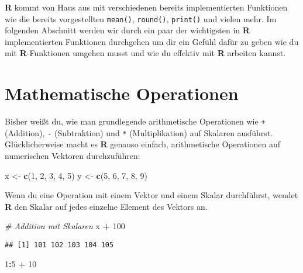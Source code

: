 \documentclass[
]{book}
\newenvironment{Shaded}{\begin{snugshade}}{\end{snugshade}}
\newcommand{\CommentTok}[1]{\textcolor[rgb]{0.56,0.35,0.01}{\textit{#1}}}
\newcommand{\DecValTok}[1]{\textcolor[rgb]{0.00,0.00,0.81}{#1}}
\newcommand{\KeywordTok}[1]{\textcolor[rgb]{0.13,0.29,0.53}{\textbf{#1}}}
\newcommand{\NormalTok}[1]{#1}
\newcommand{\OperatorTok}[1]{\textcolor[rgb]{0.81,0.36,0.00}{\textbf{#1}}}
\newcommand{\StringTok}[1]{\textcolor[rgb]{0.31,0.60,0.02}{#1}}
\begin{document}
\textbf{R} kommt von Haus aus mit verschiedenen bereits implementierten Funktionen wie die bereits vorgestellten \texttt{mean()}, \texttt{round()}, \texttt{print()} und vielen mehr.
Im folgenden Abschnitt werden wir durch ein paar der wichtigsten in \textbf{R} implementierten Funktionen durchgehen um dir ein Gefühl dafür zu geben wie du mit \textbf{R}-Funktionen umgehen musst und wie du effektiv mit \textbf{R} arbeiten kannst.

\hypertarget{mathematische-operationen}{%
\section{Mathematische Operationen}\label{mathematische-operationen}}

Bisher weißt du, wie man grundlegende arithmetische Operationen wie \texttt{+} (Addition), \texttt{-} (Subtraktion) und \texttt{*} (Multiplikation) auf Skalaren ausführst.
Glücklicherweise macht es \textbf{R} genauso einfach, arithmetische Operationen auf numerischen Vektoren durchzuführen:

\begin{Shaded}
\begin{Highlighting}[]
\NormalTok{x <-}\StringTok{ }\KeywordTok{c}\NormalTok{(}\DecValTok{1}\NormalTok{, }\DecValTok{2}\NormalTok{, }\DecValTok{3}\NormalTok{, }\DecValTok{4}\NormalTok{, }\DecValTok{5}\NormalTok{)}
\NormalTok{y <-}\StringTok{ }\KeywordTok{c}\NormalTok{(}\DecValTok{5}\NormalTok{, }\DecValTok{6}\NormalTok{, }\DecValTok{7}\NormalTok{, }\DecValTok{8}\NormalTok{, }\DecValTok{9}\NormalTok{)}
\end{Highlighting}
\end{Shaded}

Wenn du eine Operation mit einem Vektor und einem Skalar durchführst, wendet \textbf{R} den Skalar auf jedes einzelne Element des Vektors an.

\begin{Shaded}
\begin{Highlighting}[]
\CommentTok{# Addition mit Skalaren}
\NormalTok{x }\OperatorTok{+}\StringTok{ }\DecValTok{100}
\end{Highlighting}
\end{Shaded}

\begin{verbatim}
## [1] 101 102 103 104 105
\end{verbatim}

\begin{Shaded}
\begin{Highlighting}[]
\DecValTok{1}\OperatorTok{:}\DecValTok{5} \OperatorTok{+}\StringTok{ }\DecValTok{10}
\end{Highlighting}
\end{Shaded}
\end{document}
